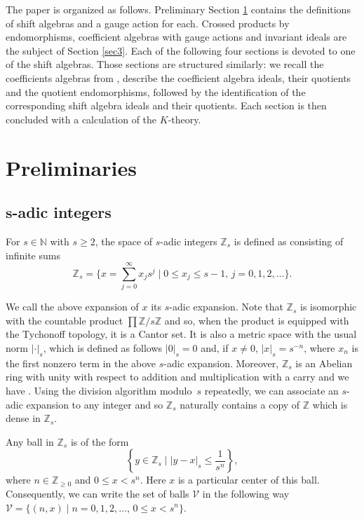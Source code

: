 \documentclass[pdftex]{sigma}
\newcommand{\N}{{\mathbb N}}
\newcommand{\Z}{{\mathbb Z}}
\numberwithin{equation}{section}
\begin{document}
The paper is organized as follows. Preliminary Section \ref{sec2} contains the definitions of shift algebras and a gauge action for each. Crossed products by endomorphisms, coefficient algebras with gauge actions and invariant ideals are the subject of Section \ref{sec3}. Each of the following four sections is devoted to one of the shift algebras. Those sections are structured similarly: we recall the coefficients algebras from \cite{HKMP3}, describe the coefficient algebra ideals, their quotients and the quotient endomorphisms, followed by the identification of the corresponding shift algebra ideals and their quotients. Each section is then concluded with a calculation of the $K$-theory.

\section{Preliminaries}\label{sec2}
\subsection[s-adic integers]{$\boldsymbol{s}$-adic integers}
For $s\in\N$ with $s\ge2$, the space of $s$-adic integers $\Z_s$ is defined as consisting of infinite sums
\begin{equation*}
\Z_s= \Biggl\{x=\sum_{j=0}^\infty x_j s^j\mid 0\le x_j\le s-1, \, j=0,1,2,\dots\Biggr\} .
\end{equation*}

We call the above expansion of $x$ its $s$-adic expansion. Note that $\Z_s$ is isomorphic with the countable product $\prod \Z/s\Z$ and so, when the product is equipped with the Tychonoff topology, it is a Cantor set. It is also a metric space with the usual norm $|\cdot|_s$, which is defined as follows
$
|0|_s=0$ and, if $x\ne 0$, $ |x|_s=s^{-n}$,
where $x_n$ is the first nonzero term in the above $s$-adic expansion.
Moreover, $\Z_s$ is an Abelian ring with unity with respect to addition and multiplication with a carry and we have
\smash{$\Z_s\cong\lim\limits_{\longleftarrow}\Z/s^n\Z$}.
Using the division algorithm modulo~$s$ repeatedly, we can associate an $s$-adic expansion to any integer and so $\Z_s$ naturally contains a copy of $\Z$ which is dense in $\Z_s$.

Any ball in $\Z_s$ is of the form
\begin{equation*}
\left\{y\in\Z_s\mid |y-x|_s\le\frac{1}{s^n}\right\},
\end{equation*}
where $n\in\Z_{\ge0}$ and $0\le x<s^n$. Here $x$ is a particular center of this ball. Consequently, we can write the set of balls $\mathcal{V}$ in the following way
$
\mathcal{V}=\{(n,x)\mid n=0,1,2,\dots,\, 0\le x<s^n\} $.
\end{document}
